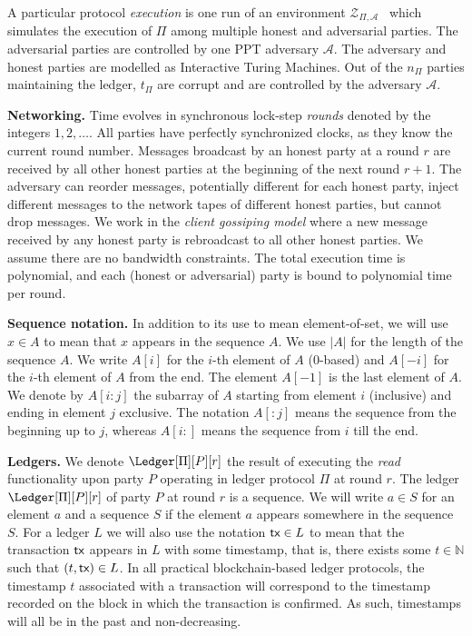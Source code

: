 A particular protocol \emph{execution}
is one run of an environment $\mathcal{Z}_{\Pi,\mathcal{A}}$~\cite{uc} which simulates
the execution of $\Pi$ among multiple honest and adversarial parties. The adversarial
parties are controlled by one PPT adversary $\mathcal{A}$. The adversary and honest
parties are modelled as Interactive Turing Machines.
Out of the
$n_\Pi$ parties maintaining the ledger, $t_\Pi$ are corrupt and are controlled by the adversary
$\mathcal{A}$.

\noindent
\textbf{Networking.}
Time evolves in synchronous lock-step \emph{rounds} denoted by the integers $1, 2,
\ldots$. All parties have perfectly synchronized clocks, as they know the current round number.
Messages broadcast by an honest party at a round $r$ are received by all
other honest parties at the beginning of the next round $r + 1$. The adversary
can reorder messages, potentially different for each honest party,
inject different messages to the network tapes of different honest parties,
but cannot drop messages. We work in the \emph{client gossiping model} where
a new message received by any honest party is rebroadcast to all other honest
parties. We assume there are no bandwidth constraints.
The total execution time is polynomial, and each (honest or adversarial)
party is bound to polynomial time per round.

\noindent
\textbf{Sequence notation.}
In addition to its use to mean element-of-set, we will use $x \in A$ to mean that $x$
appears in the sequence $A$. We use $|A|$ for the length of the sequence $A$.
We write $A[i]$ for the $i$-th element of $A$ ($0$-based) and $A[-i]$ for the
$i$-th element of $A$ from the end. The element $A[-1]$ is the last element of $A$.
We denote by $A[{i}{:}{j}]$ the subarray of $A$ starting from element $i$ (inclusive)
and ending in element $j$ exclusive. The notation $A[{:}j]$ means the sequence
from the beginning up to $j$, whereas $A[i{:}]$ means the sequence from $i$ till
the end.

\noindent
\textbf{Ledgers.}
We denote $\Ledger[\Pi][P][r]$ the result of executing the \emph{read} functionality upon party $P$
operating in ledger protocol $\Pi$ at round $r$. The ledger $\Ledger[\Pi][P][r]$ of party $P$ at round $r$ is a sequence. We will write
$a \in S$ for an element $a$ and a sequence $S$ if the element $a$ appears somewhere in
the sequence $S$. For a ledger $L$ we will also use the notation $\textsf{tx} \in L$ to mean that
the transaction $\textsf{tx}$ appears in $L$ with some timestamp, that is, there exists some $t \in \mathbb{N}$
such that $(t, \textsf{tx}) \in L$. In all practical blockchain-based ledger protocols, the timestamp $t$
associated with a transaction will correspond to the timestamp recorded on the block in which the
transaction is confirmed. As such, timestamps will all be in the past and non-decreasing.

